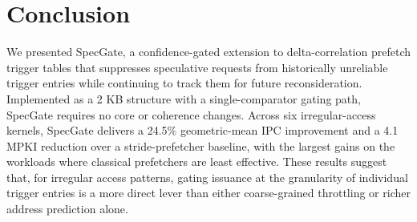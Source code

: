 \section{Conclusion}
We presented SpecGate, a confidence-gated extension to delta-correlation prefetch trigger tables that suppresses speculative requests from historically unreliable trigger entries while continuing to track them for future reconsideration. Implemented as a 2 KB structure with a single-comparator gating path, SpecGate requires no core or coherence changes. Across six irregular-access kernels, SpecGate delivers a 24.5\% geometric-mean IPC improvement and a 4.1 MPKI reduction over a stride-prefetcher baseline, with the largest gains on the workloads where classical prefetchers are least effective. These results suggest that, for irregular access patterns, gating issuance at the granularity of individual trigger entries is a more direct lever than either coarse-grained throttling or richer address prediction alone.
